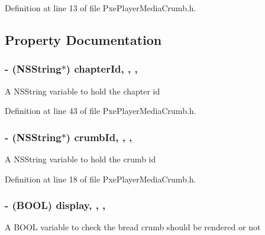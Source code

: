 Definition at line 13 of file Pxe\-Player\-Media\-Crumb.\-h.



\subsection{Property Documentation}
\hypertarget{interface_pxe_player_media_crumb_a6ac80fedf132a565c043be81c528e508}{
\subsubsection[{chapter\-Id}]{\setlength{\rightskip}{0pt plus 5cm}-\/ (N\-S\-String$\ast$) chapter\-Id\hspace{0.3cm}{\ttfamily [read]}, {\ttfamily [write]}, {\ttfamily [nonatomic]}, {\ttfamily [strong]}}}\label{interface_pxe_player_media_crumb_a6ac80fedf132a565c043be81c528e508}
A N\-S\-String variable to hold the chapter id 

Definition at line 43 of file Pxe\-Player\-Media\-Crumb.\-h.

\hypertarget{interface_pxe_player_media_crumb_ae1417eb81b8ed21748e02f174fb86612}{
\subsubsection[{crumb\-Id}]{\setlength{\rightskip}{0pt plus 5cm}-\/ (N\-S\-String$\ast$) crumb\-Id\hspace{0.3cm}{\ttfamily [read]}, {\ttfamily [write]}, {\ttfamily [nonatomic]}, {\ttfamily [strong]}}}\label{interface_pxe_player_media_crumb_ae1417eb81b8ed21748e02f174fb86612}
A N\-S\-String variable to hold the crumb id 

Definition at line 18 of file Pxe\-Player\-Media\-Crumb.\-h.

\hypertarget{interface_pxe_player_media_crumb_a052b99037caeea4d5fc07a0283e7f975}{
\subsubsection[{display}]{\setlength{\rightskip}{0pt plus 5cm}-\/ (B\-O\-O\-L) display\hspace{0.3cm}{\ttfamily [read]}, {\ttfamily [write]}, {\ttfamily [nonatomic]}, {\ttfamily [assign]}}}\label{interface_pxe_player_media_crumb_a052b99037caeea4d5fc07a0283e7f975}
A B\-O\-O\-L variable to check the bread crumb should be rendered or not 

